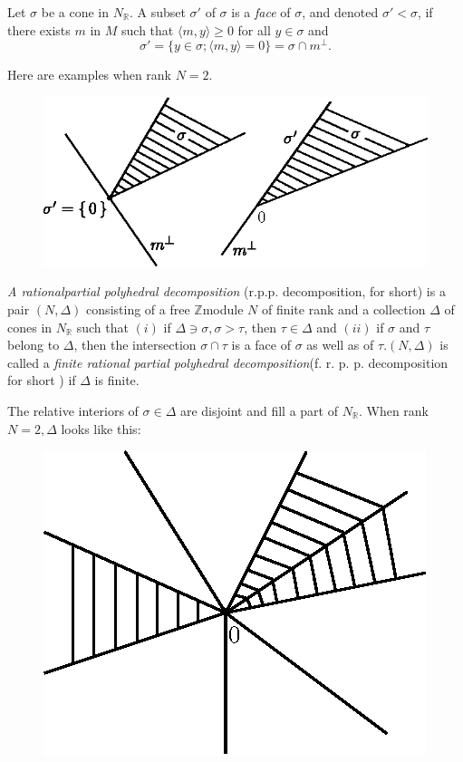 \begin{defi*}
Let $\sigma$ be a cone in $N_{\mathbb{R}}$. A subset $\sigma'$ of
$\sigma$ is a \textit{face} of $\sigma$, and denoted $\sigma' <
\sigma$, if there exists $m$ in $M$ such that $\langle m, y\rangle
\geq 0$ for all $y \in \sigma$ and  
$$
\sigma' = \{ y \in \sigma ; \langle m , y \rangle =0 \} = \sigma \cap
m^\perp .  
$$

Here are examples when rank $N = 2$. 

\begin{figure}[H]
\centering 
\includegraphics{vol58-fig/fig58-2.eps} 
\end{figure}

\end{defi*}


\begin{defi*}
{\em A rational\pageoriginale partial polyhedral decomposition}
(r.p.p. decomposition, 
for short) is a pair $(N, \Delta)$ consisting of a free
$\mathbb{Z}$module $N$ of finite rank and a collection $\Delta$ of
cones in $N_{\mathbb{R}}$ such that $(i)$ if $\Delta \ni \sigma,
\sigma > \tau $, then $\tau \in \Delta$ and $(ii)$ if $\sigma$ and
$\tau$ belong to $\Delta$, then the intersection $\sigma \cap \tau $
is a face of $\sigma$ as well as of $\tau . (N, \Delta)$ is called a
\textit{finite rational partial polyhedral
  decomposition}(f. r. p. p. decomposition for short ) if $\Delta$ is
finite.  
\end{defi*}

	The relative interiors of $\sigma \in \Delta$ are disjoint and
        fill a part of $N_{\mathbb{R}}$. When rank $N = 2, \Delta$
        looks like this: 

\begin{figure}[H]
\centering 
\includegraphics{vol58-fig/fig58-3.eps} 
\end{figure}

